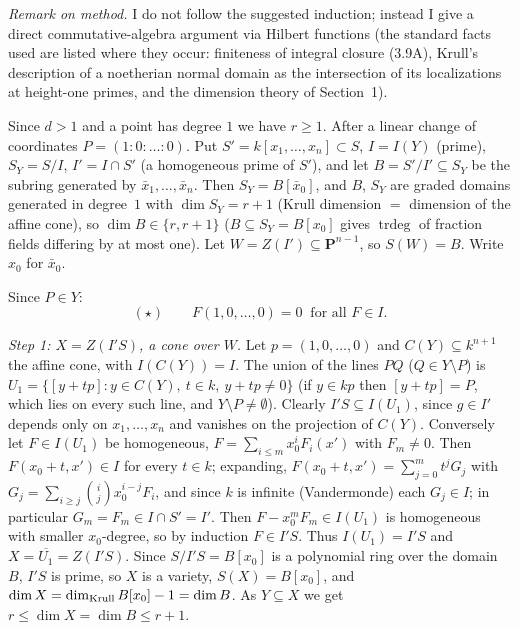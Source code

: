 \documentclass[11pt]{article}
\begin{document}
\pf
\emph{Remark on method.} I do not follow the suggested induction; instead I give a direct commutative-algebra argument via Hilbert functions (the standard facts used are listed where they occur: finiteness of integral closure (3.9A), Krull's description of a noetherian normal domain as the intersection of its localizations at height-one primes, and the dimension theory of Section~1).

Since $d>1$ and a point has degree $1$ we have $r\ge1$. After a linear change of coordinates $P=(1:0:\dots:0)$. Put $S'=k[x_1,\dots,x_n]\subset S$, $I=I(Y)$ (prime), $S_Y=S/I$, $I'=I\cap S'$ (a homogeneous prime of $S'$), and let $B=S'/I'\subseteq S_Y$ be the subring generated by $\bar x_1,\dots,\bar x_n$. Then $S_Y=B[\bar x_0]$, and $B$, $S_Y$ are graded domains generated in degree~$1$ with $\dim S_Y=r+1$ (Krull dimension $=$ dimension of the affine cone), so $\dim B\in\{r,r+1\}$ ($B\subseteq S_Y=B[x_0]$ gives $\operatorname{trdeg}$ of fraction fields differing by at most one). Let $W=Z(I')\subseteq\mathbf P^{n-1}$, so $S(W)=B$. Write $x_0$ for $\bar x_0$.

Since $P\in Y$:
\[
(\star)\qquad F(1,0,\dots,0)=0\ \text{ for all }F\in I.
\]

\emph{Step 1: $X=Z(I'S)$, a cone over $W$.} Let $p=(1,0,\dots,0)$ and $C(Y)\subseteq k^{n+1}$ the affine cone, with $I(C(Y))=I$. The union of the lines $PQ$ ($Q\in Y\setminus P$) is $U_1=\{[y+tp]:y\in C(Y),\ t\in k,\ y+tp\ne0\}$ (if $y\in kp$ then $[y+tp]=P$, which lies on every such line, and $Y\setminus P\ne\emptyset$). Clearly $I'S\subseteq I(U_1)$, since $g\in I'$ depends only on $x_1,\dots,x_n$ and vanishes on the projection of $C(Y)$. Conversely let $F\in I(U_1)$ be homogeneous, $F=\sum_{i\le m}x_0^iF_i(x')$ with $F_m\neq0$. Then $F(x_0+t,x')\in I$ for every $t\in k$; expanding, $F(x_0+t,x')=\sum_{j=0}^mt^jG_j$ with $G_j=\sum_{i\ge j}\binom ijx_0^{i-j}F_i$, and since $k$ is infinite (Vandermonde) each $G_j\in I$; in particular $G_m=F_m\in I\cap S'=I'$. Then $F-x_0^mF_m\in I(U_1)$ is homogeneous with smaller $x_0$-degree, so by induction $F\in I'S$. Thus $I(U_1)=I'S$ and $X=\overline{U_1}=Z(I'S)$. Since $S/I'S=B[x_0]$ is a polynomial ring over the domain $B$, $I'S$ is prime, so $X$ is a variety, $S(X)=B[x_0]$, and $\dim X=\dim_{\rm Krull}B[x_0]-1=\dim B$. As $Y\subseteq X$ we get $r\le\dim X=\dim B\le r+1$.
\end{document}
